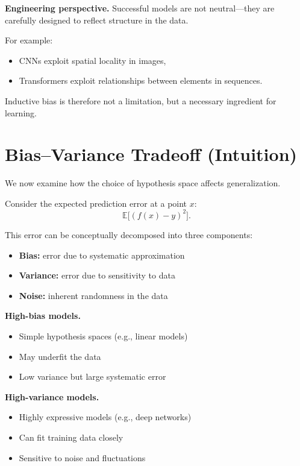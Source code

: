\medskip

\noindent
\textbf{Engineering perspective.}  
Successful models are not neutral—they are carefully designed to reflect structure in the data.

\medskip

\noindent
For example:
\begin{itemize}
    \item CNNs exploit spatial locality in images,
    \item Transformers exploit relationships between elements in sequences.
\end{itemize}

\medskip

Inductive bias is therefore not a limitation, but a necessary ingredient for learning.

\section{Bias--Variance Tradeoff (Intuition)}

We now examine how the choice of hypothesis space affects generalization.

\medskip

\noindent
Consider the expected prediction error at a point $x$:
\[
\mathbb{E}\big[(f(x) - y)^2\big].
\]

\medskip

This error can be conceptually decomposed into three components:

\begin{itemize}
    \item \textbf{Bias:} error due to systematic approximation
    \item \textbf{Variance:} error due to sensitivity to data
    \item \textbf{Noise:} inherent randomness in the data
\end{itemize}

\medskip

\noindent
\textbf{High-bias models.}
\begin{itemize}
    \item Simple hypothesis spaces (e.g., linear models)
    \item May underfit the data
    \item Low variance but large systematic error
\end{itemize}

\medskip

\noindent
\textbf{High-variance models.}
\begin{itemize}
    \item Highly expressive models (e.g., deep networks)
    \item Can fit training data closely
    \item Sensitive to noise and fluctuations
\end{itemize}

